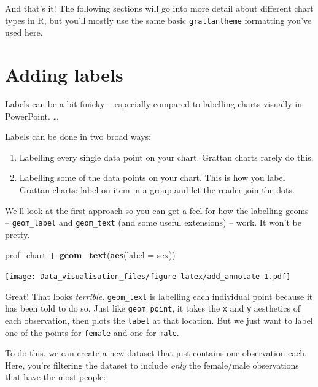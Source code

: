 \documentclass[]{book}
\newenvironment{Shaded}{\begin{snugshade}}{\end{snugshade}}
\newcommand{\DataTypeTok}[1]{\textcolor[rgb]{0.13,0.29,0.53}{#1}}
\newcommand{\KeywordTok}[1]{\textcolor[rgb]{0.13,0.29,0.53}{\textbf{#1}}}
\newcommand{\NormalTok}[1]{#1}
\newcommand{\OperatorTok}[1]{\textcolor[rgb]{0.81,0.36,0.00}{\textbf{#1}}}
\newcommand{\StringTok}[1]{\textcolor[rgb]{0.31,0.60,0.02}{#1}}
\providecommand{\tightlist}{%
  \setlength{\itemsep}{0pt}\setlength{\parskip}{0pt}}
\begin{document}
And that's it! The following sections will go into more detail about different chart types in R, but you'll mostly use the same basic \texttt{grattantheme} formatting you've used here.

\hypertarget{adding-labels}{%
\section{Adding labels}\label{adding-labels}}

Labels can be a bit finicky -- especially compared to labelling charts visually in PowerPoint. \ldots{}

Labels can be done in two broad ways:

\begin{enumerate}
\def\labelenumi{\arabic{enumi}.}
\tightlist
\item
  Labelling every single data point on your chart. Grattan charts rarely do this.
\item
  Labelling some of the data points on your chart. This is how you label Grattan charts: label on item in a group and let the reader join the dots.
\end{enumerate}

We'll look at the first approach so you can get a feel for how the labelling geoms -- \texttt{geom\_label} and \texttt{geom\_text} (and some useful extensions) -- work. It won't be pretty.

\begin{Shaded}
\begin{Highlighting}[]
\NormalTok{prof_chart }\OperatorTok{+}
\StringTok{  }\KeywordTok{geom_text}\NormalTok{(}\KeywordTok{aes}\NormalTok{(}\DataTypeTok{label =}\NormalTok{ sex))}
\end{Highlighting}
\end{Shaded}

\texttt{[image: Data\_visualisation\_files/figure-latex/add\_annotate-1.pdf]}

Great! That looks \emph{terrible}. \texttt{geom\_text} is labelling each individual point because it has been told to do so. Just like \texttt{geom\_point}, it takes the \texttt{x} and \texttt{y} aesthetics of each observation, then plots the \texttt{label} at that location. But we just want to label one of the points for \texttt{female} and one for \texttt{male}.

To do this, we can create a new dataset that just contains one observation each. Here, you're filtering the dataset to include \emph{only} the female/male observations that have the most people:
\end{document}

